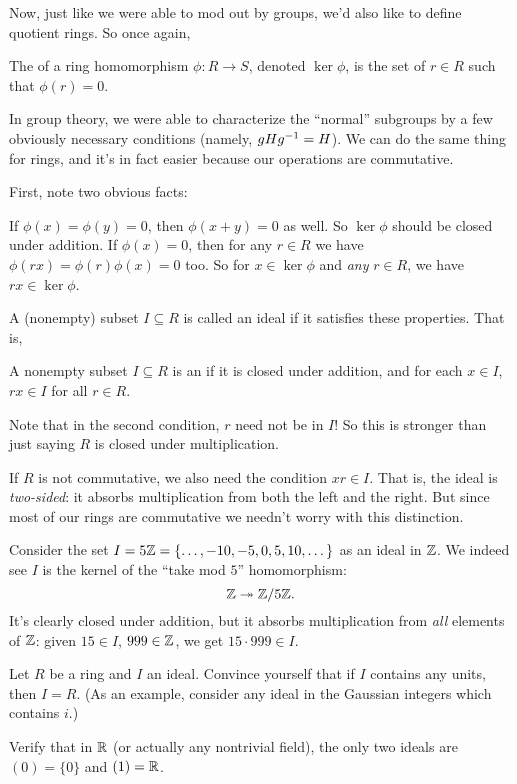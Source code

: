 Now, just like we were able to mod out by groups, we'd also like to define quotient rings.
So once again,
\begin{definition}
	The  of a ring homomorphism $\phi : R \to S$,
	denoted $\ker \phi$, is the set of $r \in R$ such that $\phi(r) = 0$.
\end{definition}

In group theory, we were able to characterize the ``normal'' subgroups by a few
obviously necessary conditions (namely, $gHg^{-1} = H$).
We can do the same thing for rings, and it's in fact easier because our operations are commutative.

First, note two obvious facts:
\begin{itemize}
	\ii If $\phi(x) = \phi(y) = 0$, then $\phi(x+y) = 0$ as well.
	So $\ker \phi$ should be closed under addition.
	\ii If $\phi(x) = 0$, then for any $r \in R$ we have
	$\phi(rx) = \phi(r)\phi(x) = 0$ too.
	So for $x \in \ker \phi$ and \emph{any} $r \in R$,
	we have $rx \in \ker\phi$.
\end{itemize}

A (nonempty) subset $I \subseteq R$ is called
an ideal if it satisfies these properties.
That is,
\begin{definition}
	A nonempty subset $I \subseteq R$ is an 
	if it is closed under addition, and for each $x \in I$,
	$rx \in I$ for all $r \in R$.
\end{definition}
Note that in the second condition, $r$ need not be in $I$!
So this is stronger than just saying $R$ is closed under multiplication.
\begin{remark}
	If $R$ is not commutative, we also need the condition $xr \in I$.
	That is, the ideal is \emph{two-sided}: it absorbs multiplication
	from both the left and the right.
	But since most of our rings are commutative we needn't worry with this distinction.
\end{remark}

\begin{example}
	Consider the set $I = 5\mathbb Z = \{\dots,-10,-5,0,5,10,\dots\}$ as an ideal in $\mathbb Z$.
	We indeed see $I$ is the kernel of the ``take mod $5$'' homomorphism:
	\[ \mathbb Z \twoheadrightarrow \mathbb Z/5\mathbb Z. \]
	It's clearly closed under addition,
	but it absorbs multiplication from \emph{all} elements of $\mathbb Z$:
	given $15 \in I$, $999 \in \mathbb Z$, we get $15 \cdot 999 \in I$.
\end{example}

\begin{ques}
	Let $R$ be a ring and $I$ an ideal.
	Convince yourself that if $I$ contains any units, then $I = R$.
	(As an example, consider any ideal in the Gaussian integers
	which contains $i$.)
\end{ques}
\begin{ques}
	Verify that in $\mathbb R$ (or actually any nontrivial field),
	the only two ideals are $(0) = \{0\}$ and $(1) = \mathbb R$.
\end{ques}

